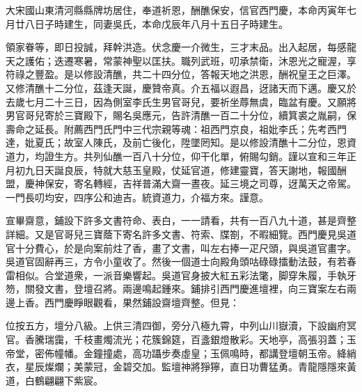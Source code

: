 \begin{myquote}[\markfont]
大宋國山東清河縣縣牌坊居住，奉道祈恩，酬醮保安，信官西門慶，本命丙寅年七月廿八日子時建生，同妻吳氏，本命戊辰年八月十五日子時建生。


領家眷等，即日投誠，拜幹洪造。伏念慶一介微生，三才末品。出入起居，每感龍天之護佑；迭遷寒暑，常蒙神聖以匡扶。職列武班，叨承禁衛，沐恩光之寵渥，享符祿之豐盈。是以修設清醮，共二十四分位，答報天地之洪恩，酬祝皇王之巨澤。又修清醮十二分位，茲逢天誕，慶贊帝真。介五福以遐昌，迓諸天而下邁。慶又於去歲七月二十三日，因為側室李氏生男官哥兒，要祈坐蓐無虞，臨盆有慶。又願將男官哥兒寄於三寶殿下，賜名吳應元，告許清醮一百二十分位，續箕裘之胤嗣，保壽命之延長。附薦西門氏門中三代宗親等魂：祖西門京良，祖妣李氏；先考西門達，妣夏氏；故室人陳氏，及前亡後化，陞墜罔知。是以修設清醮十二分位，恩資道力，均證生方。共列仙醮一百八十分位，仰干化單，俯賜勾銷。謹以宣和三年正月初九日天誕良辰，特就大慈玉皇殿，仗延官道，修建靈寶，答天謝地，報國酬盟，慶神保安，寄名轉經，吉祥普滿大齋一晝夜。延三境之司尊，迓萬天之帝駕。一門長叨均安，四序公和迪吉。統資道力，介福方來。謹意。
\end{myquote}

宣畢齋意，鋪設下許多文書符命、表白，一一請看，共有一百八九十道，甚是齊整詳細。又是官哥兒三寶蔭下寄名許多文書、符索、牒劄，不暇細覽。西門慶見吳道官十分費心，於是向案前炷了香，畫了文書，叫左右捧一疋尺頭，與吳道官畫字。吳道官固辭再三，方令小童收了。然後一個道士向殿角頭咕碌碌擂動法鼓，有若春雷相似。合堂道衆，一派音樂響起。吳道官身披大紅五彩法氅，脚穿朱履，手執牙笏，關發文書，登壇召將。兩邊鳴起鍾來。鋪排引西門慶進壇裡，向三寶案左右兩邊上香。西門慶睜眼觀看，果然鋪設齋壇齊整。但見：

\begin{myquote}
位按五方，壇分八級。上供三清四御，旁分八極九霄，中列山川嶽瀆，下設幽府冥官。香騰瑞靄，千枝畫燭流光；花簇錦筵，百盞銀燈散彩。天地亭，高張羽蓋；玉帝堂，密佈幢幡。金鐘撞處，高功躡步奏虛皇；玉佩鳴時，都講登壇朝玉帝。絳綃衣，星辰燦爛；美蒙冠，金碧交加。監壇神將猙獰，直日功曹猛勇。青龍隱隱來黃道，白鶴翩翩下紫宸。
\end{myquote}

